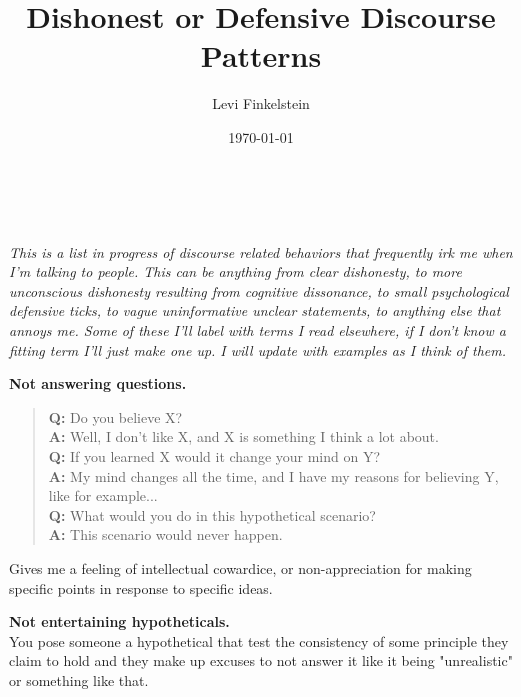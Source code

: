 \documentclass[12pt,english]{article}
\title{Dishonest or Defensive Discourse Patterns}
\author{Levi Finkelstein}
\date{\today}
\begin{document}
\maketitle
\\\\
\it{This is a list in progress of discourse related behaviors that frequently irk me when I'm talking to people. This can be anything from clear dishonesty, to more unconscious dishonesty resulting from cognitive dissonance, to small  psychological defensive ticks, to vague uninformative unclear statements, to anything else that annoys me. Some of these I'll label with terms I read elsewhere, if I don't know a fitting term I'll just make one up. I will update with examples as I think of them.}
\par
\textbf{Not answering questions.} 
\begin{quote}
\textbf{Q:} Do you believe X?\\ \textbf{A:} Well, I don't like X, and X is something I think a lot about. \\ \textbf{Q:} If you learned X would it change your mind on Y? \\ \textbf{A:} My mind changes all the time, and I have my reasons for believing Y, like for example...\\ \textbf{Q:} What would you do in this hypothetical scenario?\\ \textbf{A:} This scenario would never happen.\\ 
\end{quote}
Gives me a feeling of intellectual cowardice, or non-appreciation for making specific points in response to specific ideas.

\par
\textbf{Not entertaining hypotheticals.}\\
You pose someone a hypothetical that test the consistency of some principle they claim to hold and they make up excuses to not answer it like it being "unrealistic" or something like that.
\end{document}
